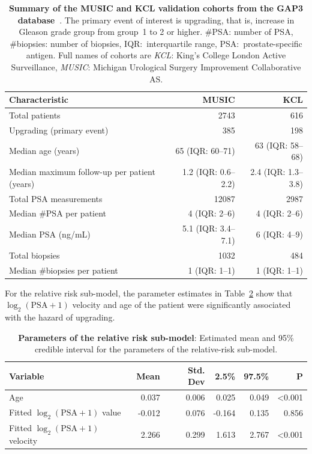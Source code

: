 \begin{subappendices}
\begin{table}
\small
\centering
\caption{\textbf{Summary of the MUSIC and KCL validation cohorts from the GAP3 database~\citep{gap3_2018}}. The primary event of interest is upgrading, that is, increase in Gleason grade group from group~1 to 2 or higher. \#PSA: number of PSA, \#biopsies: number of biopsies, IQR:~interquartile range, PSA:~prostate-specific antigen. Full names of cohorts are \textit{KCL}: King's College London Active Surveillance, \textit{MUSIC}: Michigan Urological Surgery Improvement Collaborative AS.}
\label{c5:tab:gap3_summary_3}
\begin{tabular}{p{5cm}rr}
\hline
\textbf{Characteristic} & \textbf{MUSIC} & \textbf{KCL}\\
\hline
Total patients & 2743 & 616\\
Upgrading (primary event) & 385 & 198\\
\hline
Median age (years) & 65 (IQR: 60--71) & 63 (IQR: 58--68)\\
Median maximum follow-up per patient (years) & 1.2 (IQR: 0.6--2.2) & 2.4 (IQR: 1.3--3.8)\\
Total PSA measurements & 12087 & 2987\\
Median \#PSA per patient & 4 (IQR: 2--6) & 4 (IQR: 2--6)\\
Median PSA (ng/mL) & 5.1 (IQR: 3.4--7.1) & 6 (IQR: 4--9)\\
Total biopsies & 1032 & 484\\
Median \#biopsies per patient & 1 (IQR: 1--1) & 1 (IQR: 1--1)\\
\hline
\end{tabular}
\end{table}

For the relative risk sub-model, the parameter estimates in Table~\ref{c5:tab:PSA_survival} show that ${\log_2 (\mbox{PSA} + 1)}$ velocity and age of the patient were significantly associated with the hazard of upgrading.

\begin{table}
\small
\centering
\caption{\textbf{Parameters of the relative risk sub-model}: Estimated mean and 95\% credible interval for the parameters of the relative-risk sub-model.}
\label{c5:tab:PSA_survival}
\begin{tabular}{lrrrrr}
\hline
Variable                      & Mean   & Std. Dev & 2.5\%  & 97.5\%                 & P              \\
\hline
Age                      & 0.037    & 0.006 & 0.025  & 0.049  & \textless0.001 \\
Fitted $\log_2 (\mbox{PSA} + 1)$ value            & -0.012   & 0.076 & -0.164 & 0.135  & 0.856 \\
Fitted $\log_2 (\mbox{PSA} + 1)$ velocity             & 2.266    & 0.299 & 1.613  & 2.767  & \textless0.001   \\
\hline
\end{tabular}
\end{table}


\end{subappendices}
